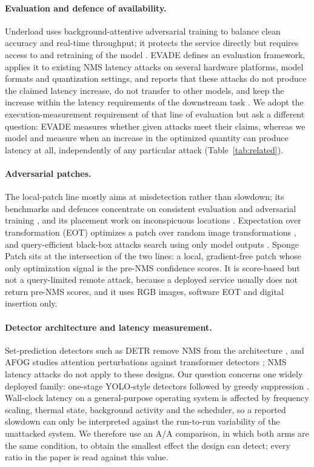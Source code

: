 \documentclass[a4paper,fleqn]{cas-dc}
\begin{document}
\paragraph{Evaluation and defence of availability.}
Underload uses background-attentive adversarial training to balance clean accuracy and real-time throughput; it protects the service directly but requires access to and retraining of the model \cite{underload2025}. EVADE defines an evaluation framework, applies it to existing NMS latency attacks on several hardware platforms, model formats and quantization settings, and reports that these attacks do not produce the claimed latency increase, do not transfer to other models, and keep the increase within the latency requirements of the downstream task \cite{evade2025}. We adopt the execution-measurement requirement of that line of evaluation but ask a different question: EVADE measures whether given attacks meet their claims, whereas we model and measure when an increase in the optimized quantity can produce latency at all, independently of any particular attack (Table~\ref{tab:related}).

\paragraph{Adversarial patches.}
The local-patch line mostly aims at misdetection rather than slowdown; its benchmarks and defences concentrate on consistent evaluation and adversarial training \cite{apde2025,pbcat2025}, and its placement work on inconspicuous locations \cite{iap2025}. Expectation over transformation (EOT) optimizes a patch over random image transformations \cite{athalye2018eot}, and query-efficient black-box attacks search using only model outputs \cite{ilyas2018blackbox}. Sponge Patch sits at the intersection of the two lines: a local, gradient-free patch whose only optimization signal is the pre-NMS confidence scores. It is score-based but not a query-limited remote attack, because a deployed service usually does not return pre-NMS scores, and it uses RGB images, software EOT and digital insertion only.

\paragraph{Detector architecture and latency measurement.}
Set-prediction detectors such as DETR remove NMS from the architecture \cite{carion2020detr}, and AFOG studies attention perturbations against transformer detectors \cite{afog2025}; NMS latency attacks do not apply to these designs. Our question concerns one widely deployed family: one-stage YOLO-style detectors followed by greedy suppression \cite{redmon2016yolo,neubeck2006nms}. Wall-clock latency on a general-purpose operating system is affected by frequency scaling, thermal state, background activity and the scheduler, so a reported slowdown can only be interpreted against the run-to-run variability of the unattacked system. We therefore use an A/A comparison, in which both arms are the same condition, to obtain the smallest effect the design can detect; every ratio in the paper is read against this value.
\end{document}
